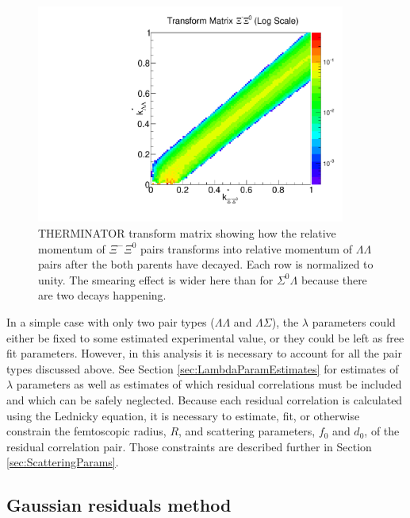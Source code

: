 \begin{figure}[hbt]
\begin{center}
\includegraphics[width=24pc]{Figures/TransformMatrices/2016-7-20-TransformMatrixXiCXi0NormLog.pdf}
\end{center}
\caption[Transform matrix for $k^*_{\Xi^-\Xi^0} \rightarrow k^*_{\Lambda\Lambda}$]{THERMINATOR \cite{Chojnacki:2011hb} transform matrix showing how the relative momentum of $\Xi^-\Xi^0$ pairs transforms into relative momentum of $\Lambda\Lambda$ pairs after the both parents have decayed. Each row is normalized to unity. The smearing effect is wider here than for $\Sigma^0\Lambda$ because there are two decays happening.}
\label{fig:TherminatorXcX0}
\end{figure}

In a simple case with only two pair types ($\Lambda\Lambda$ and $\Lambda\Sigma$), the $\lambda$ parameters could either be fixed to some estimated experimental value, or they could be left as free fit parameters.
However, in this analysis it is necessary to account for all the pair types discussed above.
See Section \ref{sec:LambdaParamEstimates} for estimates of $\lambda$ parameters as well as estimates of which residual correlations must be included and which can be safely neglected.  
Because each residual correlation is calculated using the Lednicky equation, it is necessary to estimate, fit, or otherwise constrain the femtoscopic radius, $R$, and scattering parameters, $f_0$ and $d_0$, of the residual correlation pair.
Those constraints are described further in Section \ref{sec:ScatteringParams}.

\subsection{Gaussian residuals method}
\label{sec:GaussianResiduals}

